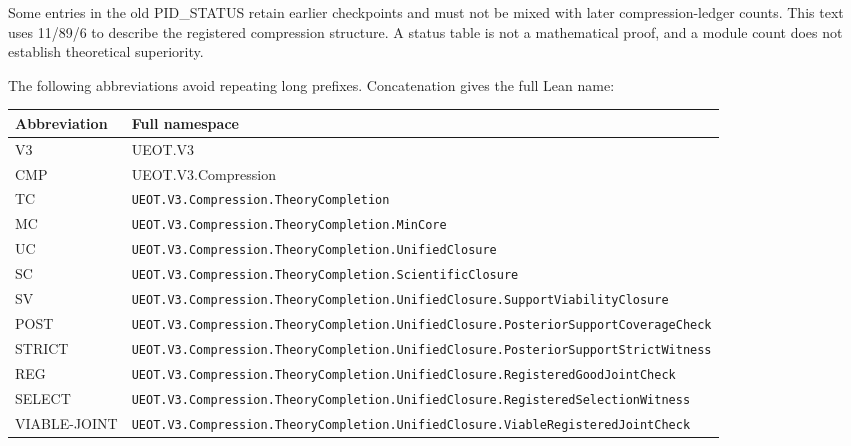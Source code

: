 \documentclass[
  english,
  11pt,
  oneside]{book}
\newcounter{none} %
\begin{document}
Some entries in the old PID\_STATUS retain earlier checkpoints and must not be mixed with later compression-ledger counts. This text uses 11/89/6 to describe the registered compression structure. A status table is not a mathematical proof, and a module count does not establish theoretical superiority.

The following abbreviations avoid repeating long prefixes. Concatenation gives the full Lean name:

{\def\LTcaptype{none} %
\begin{longtable}[]{@{}
  >{\raggedright\arraybackslash}p{}
  >{\raggedright\arraybackslash}p{}@{}}
\toprule\noalign{}
\begin{minipage}[b]{\linewidth}\raggedright
Abbreviation
\end{minipage} & \begin{minipage}[b]{\linewidth}\raggedright
Full namespace
\end{minipage} \\
\midrule\noalign{}
\endhead
\bottomrule\noalign{}
\endlastfoot
V3 & UEOT.V3 \\
CMP & UEOT.V3.Compression \\
TC & \nolinkurl{UEOT.V3.Compression.TheoryCompletion} \\
MC & \nolinkurl{UEOT.V3.Compression.TheoryCompletion.MinCore} \\
UC & \nolinkurl{UEOT.V3.Compression.TheoryCompletion.UnifiedClosure} \\
SC & \nolinkurl{UEOT.V3.Compression.TheoryCompletion.ScientificClosure} \\
SV & \nolinkurl{UEOT.V3.Compression.TheoryCompletion.UnifiedClosure.SupportViabilityClosure} \\
POST & \nolinkurl{UEOT.V3.Compression.TheoryCompletion.UnifiedClosure.PosteriorSupportCoverageCheck} \\
STRICT & \nolinkurl{UEOT.V3.Compression.TheoryCompletion.UnifiedClosure.PosteriorSupportStrictWitness} \\
REG & \nolinkurl{UEOT.V3.Compression.TheoryCompletion.UnifiedClosure.RegisteredGoodJointCheck} \\
SELECT & \nolinkurl{UEOT.V3.Compression.TheoryCompletion.UnifiedClosure.RegisteredSelectionWitness} \\
VIABLE-JOINT & \nolinkurl{UEOT.V3.Compression.TheoryCompletion.UnifiedClosure.ViableRegisteredJointCheck} \\
\end{longtable}
}
\end{document}
